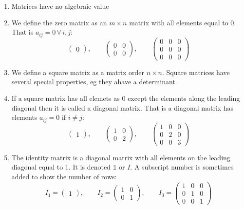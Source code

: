 \documentclass{article}
\newcommand{\A}{\forall\,}
\begin{document}
\begin{enumerate}
\item Matrices have no algebraic value
\item We define the zero matrix as an \(m\times n\) matrix with all elements equal to 0. That is \(a_{ij}=0\, \A i,j\):
\[
\begin{pmatrix}
0
\end{pmatrix}
,\qquad
\begin{pmatrix}
0 & 0\\
0 & 0
\end{pmatrix}
,\qquad
\begin{pmatrix}
0 & 0 & 0\\
0 & 0 & 0\\
0 & 0 & 0
\end{pmatrix}
\]
\item We define a square matrix as a matrix order \(n\times n\). Square matrices have several special properties, eg they ahave a determinant.
\item If a square matrix has all elemets as 0 except the elements along the leading diagonal then it is called a diagonal matrix. That is a diagonal matrix has elements \(a_{ij}=0\) if \(i\ne j\):
\[
\begin{pmatrix}
1
\end{pmatrix}
,\qquad
\begin{pmatrix}
1 & 0\\
0 & 2
\end{pmatrix}
,\qquad
\begin{pmatrix}
1 & 0 & 0\\
0 & 2 & 0\\
0 & 0 & 3
\end{pmatrix}
\]
\item The identity matrix is a diagonal matrix with all elements on the leading diagonal equal to 1. It is denoted \(\mathds 1\) or \(I\). A subscript number is sometimes added to show the number of rows:
\[I_1=
\begin{pmatrix}
1
\end{pmatrix}
,\qquad I_2=
\begin{pmatrix}
1 & 0\\
0 & 1
\end{pmatrix}
,\qquad I_3=
\begin{pmatrix}
1 & 0 & 0\\
0 & 1 & 0\\
0 & 0 & 1
\end{pmatrix}
\]


\end{enumerate}
\end{document}
